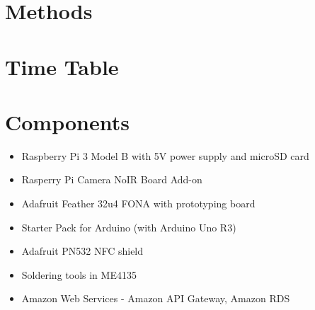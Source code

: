 \documentclass{article}
\begin{document}
\lipsum[1]

\section{Methods}


\lipsum[1]

\section{Time Table}


\lipsum[1]

\section{Components}

\begin{itemize}
\item Raspberry Pi 3 Model B with 5V power supply and microSD card
\item Rasperry Pi Camera NoIR Board Add-on
\item Adafruit Feather 32u4 FONA with prototyping board
\item Starter Pack for Arduino (with Arduino Uno R3)
\item Adafruit PN532 NFC shield
\item Soldering tools in ME4135
\item Amazon Web Services - Amazon API Gateway, Amazon RDS
\end{itemize}

\pagebreak

\printbibliography
\end{document}

